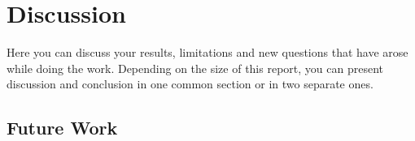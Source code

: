 \section{Discussion}
\label{section:disc}
Here you can discuss your results, limitations and new questions that have arose while doing the work. Depending on the size of this report, you can present discussion and conclusion in one common section or in two separate ones. 



\subsection{Future Work}